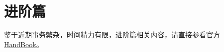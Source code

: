 \chapter{进阶篇}
鉴于近期事务繁杂，时间精力有限，进阶篇相关内容，请直接参看\href{https://www.freebsd.org/doc/en_US.ISO8859-1/books/handbook/index.html}{官方HandBook}。

\clearpage







